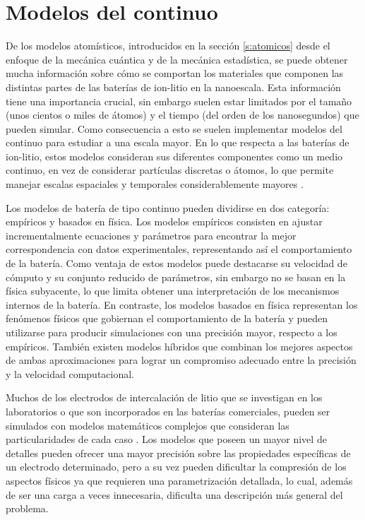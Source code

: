 \section{Modelos del continuo}

De los modelos atomísticos, introducidos en la sección \ref{s:atomicos} desde 
el enfoque de la mecánica cuántica y de la mecánica estadística, se puede obtener
mucha información sobre cómo se comportan los materiales que componen las
distintas partes de las baterías de ion-litio en la nanoescala. Esta información 
tiene una importancia crucial, sin embargo suelen estar limitados por el tamaño
(unos cientos o miles de átomos) y el tiempo (del orden de los nanosegundos) que 
pueden simular. Como consecuencia a esto se suelen implementar modelos del 
continuo para estudiar a una escala mayor. En lo que respecta a las baterías de 
ion-litio, estos modelos consideran sus diferentes componentes como un medio 
continuo, en vez de considerar partículas discretas o átomos, lo que permite
manejar escalas espaciales y temporales considerablemente mayores \cite{brosa2022}.

Los modelos de batería de tipo continuo pueden dividirse en dos categoría:
empíricos y basados en física. Los modelos empíricos consisten en ajustar 
incrementalmente ecuaciones y parámetros para encontrar la mejor correspondencia
con datos experimentales, representando así el comportamiento de la batería. 
Como ventaja de estos modelos puede destacarse su velocidad de cómputo y su
conjunto reducido de parámetros, sin embargo no se basan en la física subyacente, 
lo que limita obtener una interpretación de los mecanismos internos de la batería.
En contraste, los modelos basados en física representan los fenómenos físicos 
que gobiernan el comportamiento de la batería y pueden utilizarse para producir 
simulaciones con una precisión mayor, respecto a los empíricos. También existen
modelos híbridos que combinan los mejores aspectos de ambas aproximaciones para 
lograr un compromiso adecuado entre la precisión y la velocidad computacional.

Muchos de los electrodos de intercalación de litio que se investigan en los 
laboratorios o que son incorporados en las baterías comerciales, pueden ser 
simulados con modelos matemáticos complejos que consideran las particularidades 
de cada caso \cite{doyle1995}. Los modelos que poseen un mayor nivel de detalles 
pueden ofrecer una mayor precisión sobre las propiedades 
específicas de un electrodo determinado, pero a su vez pueden dificultar la 
compresión de los aspectos físicos ya que requieren una parametrización detallada, 
lo cual, además de ser una carga a veces innecesaria, dificulta una descripción 
más general del problema. 


